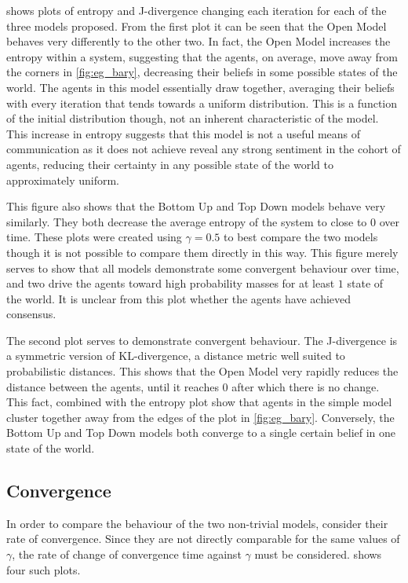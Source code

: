 shows plots of entropy and J-divergence changing each iteration for each of the three models proposed. From the first plot it can be seen that the Open Model behaves very differently to the other two. In fact, the Open Model increases the entropy within a system, suggesting that the agents, on average, move away from the corners in \cref{fig:eg_bary}, decreasing their beliefs in some possible states of the world. The agents in this model essentially draw together, averaging their beliefs with every iteration that tends towards a uniform distribution. This is a function of the initial distribution though, not an inherent characteristic of the model. This increase in entropy suggests that this model is not a useful means of communication as it does not achieve reveal any strong sentiment in the cohort of agents, reducing their certainty in any possible state of the world to approximately uniform. 

This figure also shows that the Bottom Up and Top Down models behave very similarly. They both decrease the average entropy of the system to close to $0$ over time. These plots were created using $\gamma = 0.5$ to best compare the two models though it is not possible to compare them directly in this way. This figure merely serves to show that all models demonstrate some convergent behaviour over time, and two drive the agents toward high probability masses for at least $1$ state of the world. It is unclear from this plot whether the agents have achieved consensus. 

The second plot serves to demonstrate convergent behaviour. The J-divergence is a symmetric version of KL-divergence, a distance metric well suited to probabilistic distances. This shows that the Open Model very rapidly reduces the distance between the agents, until it reaches $0$ after which there is no change. This fact, combined with the entropy plot show that agents in the simple model cluster together away from the edges of the plot in \cref{fig:eg_bary}. Conversely, the Bottom Up and Top Down models both converge to a single certain belief in one state of the world. 



\subsection{Convergence}

In order to compare the behaviour of the two non-trivial models, consider their rate of convergence. Since they are not directly comparable for the same values of $\gamma$, the rate of change of convergence time against $\gamma$ must be considered.  shows four such plots. 

